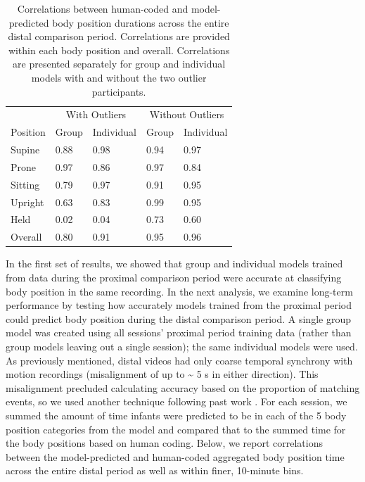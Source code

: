\documentclass[
  man]{apa6}
\begin{document}
\begin{table}[tbp]

\begin{center}
\begin{threeparttable}

\caption{\label{tab:pt2overalltable}Correlations between human-coded and model-predicted body position durations across the entire distal comparison period. Correlations are provided within each body position and overall. Correlations are presented separately for group and individual models with and without the two outlier participants.}

\begin{tabular}{lllll}
\toprule
 & \multicolumn{2}{c}{With Outliers} & \multicolumn{2}{c}{Without Outliers} \\
\cmidrule(r){2-3} \cmidrule(r){4-5}
Position & Group & Individual & Group & Individual\\
\midrule
Supine & 0.88 & 0.98 & 0.94 & 0.97\\
Prone & 0.97 & 0.86 & 0.97 & 0.84\\
Sitting & 0.79 & 0.97 & 0.91 & 0.95\\
Upright & 0.63 & 0.83 & 0.99 & 0.95\\
Held & 0.02 & 0.04 & 0.73 & 0.60\\ \midrule
Overall & 0.80 & 0.91 & 0.95 & 0.96\\
\bottomrule
\end{tabular}

\end{threeparttable}
\end{center}

\end{table}

In the first set of results, we showed that group and individual models trained from data during the proximal comparison period were accurate at classifying body position in the same recording. In the next analysis, we examine long-term performance by testing how accurately models trained from the proximal period could predict body position during the distal comparison period. A single group model was created using all sessions' proximal period training data (rather than group models leaving out a single session); the same individual models were used. As previously mentioned, distal videos had only coarse temporal synchrony with motion recordings (misalignment of up to \textasciitilde{} 5 s in either direction). This misalignment precluded calculating accuracy based on the proportion of matching events, so we used another technique following past work \autocite{YaoPlotz2019,FranchakScott2021}. For each session, we summed the amount of time infants were predicted to be in each of the 5 body position categories from the model and compared that to the summed time for the body positions based on human coding. Below, we report correlations between the model-predicted and human-coded aggregated body position time across the entire distal period as well as within finer, 10-minute bins.
\end{document}
